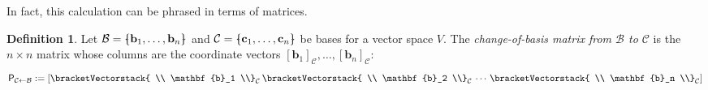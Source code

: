 \documentclass[a4paper,11pt]{book}
\theoremstyle{definition}
\newtheorem{definition}[theorem]{Definition}
\newcommand{\ve}[1]{\mathbf{#1}}
\newcommand{\mat}[1]{\mathsf{#1}}
\newcommand{\basis}[1]{{\mathcal #1}}
\newcommand{\cvector}[1]{\bracketVectorstack{#1}}
\newcommand{\bmark}{\raisebox{.53ex}{\rule{.2em}{.1ex}}}
\newcommand{\bopen}{{\protect\ooalign{\{\cr\hfil\bmark\hfil\cr}}}
\newcommand{\bclose}{{\protect\ooalign{\}\cr\hfil\bmark\hfil\cr}}}
\begin{document}
In fact, this calculation can be phrased in terms of matrices.
\begin{definition} Let $\basis{B} = \bopen \ve{b}_1, \ldots, \ve{b}_n \bclose$ and $\basis{C} = \bopen \ve{c}_1, \ldots, \ve{c}_n \bclose$ be bases for a vector space $V$. The {\em change-of-basis matrix from $\basis{B}$ to $\basis{C}$} is the $n \times n$ matrix whose columns are the coordinate vectors $[\ve{b}_1]_\basis{C}, \ldots, [\ve{b}_n]_\basis{C}$:
\[
 \mat{P}_{\basis{C} \leftarrow \basis{B}} := \left[ \cvector{ \\ \ve{b}_1 \\}_\basis{C} \,  \cvector{ \\ \ve{b}_2 \\}_\basis{C} \, \cdots \, \cvector{ \\ \ve{b}_n \\}_\basis{C}\right]
\]
\end{definition}
\end{document}
